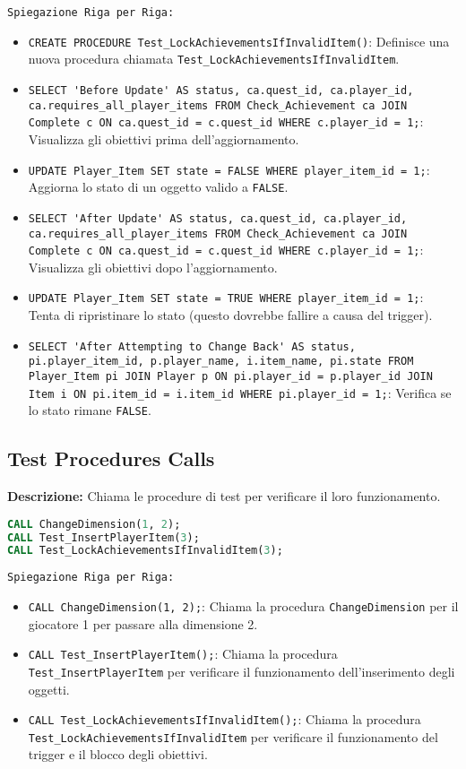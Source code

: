 \documentclass{article}
\begin{document}
\texttt{Spiegazione Riga per Riga:}
\begin{itemize}
    \item \lstinline|CREATE PROCEDURE Test_LockAchievementsIfInvalidItem()|: Definisce una nuova procedura chiamata \lstinline|Test_LockAchievementsIfInvalidItem|.
    \item \lstinline|SELECT 'Before Update' AS status, ca.quest_id, ca.player_id, ca.requires_all_player_items FROM Check_Achievement ca JOIN Complete c ON ca.quest_id = c.quest_id WHERE c.player_id = 1;|: Visualizza gli obiettivi prima dell'aggiornamento.
    \item \lstinline|UPDATE Player_Item SET state = FALSE WHERE player_item_id = 1;|: Aggiorna lo stato di un oggetto valido a \lstinline|FALSE|.
    \item \lstinline|SELECT 'After Update' AS status, ca.quest_id, ca.player_id, ca.requires_all_player_items FROM Check_Achievement ca JOIN Complete c ON ca.quest_id = c.quest_id WHERE c.player_id = 1;|: Visualizza gli obiettivi dopo l'aggiornamento.
    \item \lstinline|UPDATE Player_Item SET state = TRUE WHERE player_item_id = 1;|: Tenta di ripristinare lo stato (questo dovrebbe fallire a causa del trigger).
    \item \lstinline|SELECT 'After Attempting to Change Back' AS status, pi.player_item_id, p.player_name, i.item_name, pi.state FROM Player_Item pi JOIN Player p ON pi.player_id = p.player_id JOIN Item i ON pi.item_id = i.item_id WHERE pi.player_id = 1;|: Verifica se lo stato rimane \lstinline|FALSE|.
\end{itemize}

\subsection*{Test Procedures Calls}

\textbf{Descrizione:} Chiama le procedure di test per verificare il loro funzionamento.

\begin{lstlisting}[language=SQL]
CALL ChangeDimension(1, 2);
CALL Test_InsertPlayerItem(3);
CALL Test_LockAchievementsIfInvalidItem(3);
\end{lstlisting}

\texttt{Spiegazione Riga per Riga:}
\begin{itemize}
    \item \lstinline|CALL ChangeDimension(1, 2);|: Chiama la procedura \lstinline|ChangeDimension| per il giocatore 1 per passare alla dimensione 2.
    \item \lstinline|CALL Test_InsertPlayerItem();|: Chiama la procedura \lstinline|Test_InsertPlayerItem| per verificare il funzionamento dell'inserimento degli oggetti.
    \item \lstinline|CALL Test_LockAchievementsIfInvalidItem();|: Chiama la procedura \lstinline|Test_LockAchievementsIfInvalidItem| per verificare il funzionamento del trigger e il blocco degli obiettivi.
\end{itemize}
\end{document}
